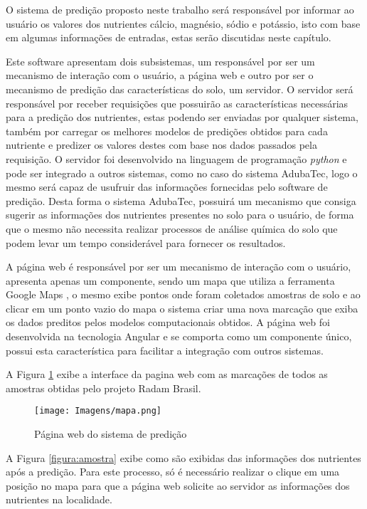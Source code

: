 \documentclass[
12pt,				%
oneside,			%
a4paper,			%
english,			%
french,				%
spanish,			%
brazil				%
]{abntex2}
\begin{document}
O sistema de predição proposto neste trabalho será responsável por informar ao usuário os valores dos nutrientes cálcio, magnésio, sódio e potássio, isto com base em algumas informações de entradas, estas serão discutidas neste capítulo. 

Este software apresentam dois subsistemas, um responsável por ser um mecanismo de interação com o usuário, a página web e outro por ser o mecanismo de predição das características do solo, um servidor. O servidor será responsável por receber requisições que possuirão as características necessárias para a predição dos nutrientes, estas podendo ser enviadas por qualquer sistema, também por carregar os melhores modelos de predições obtidos para cada nutriente e predizer os valores destes com base nos dados passados pela requisição. O servidor foi desenvolvido na linguagem de programação \textit{python} e pode ser integrado a outros sistemas, como no caso do sistema AdubaTec, logo o mesmo será capaz de usufruir das informações fornecidas pelo software de predição. Desta forma o sistema AdubaTec, possuirá um mecanismo que consiga sugerir as informações dos nutrientes presentes no solo para o usuário, de forma que o mesmo não necessita realizar processos de análise química do solo que podem levar um tempo considerável para fornecer os resultados.

A página web é responsável por ser um mecanismo de interação com o usuário, apresenta apenas um componente, sendo um mapa que utiliza a ferramenta Google Maps \textsuperscript{\textregistered}, o mesmo exibe pontos onde foram coletados amostras de solo e ao clicar em um ponto vazio do mapa  o sistema criar uma nova marcação que exiba os dados preditos pelos modelos computacionais obtidos. A página web foi desenvolvida na tecnologia Angular e se comporta como um componente único, possui esta característica para facilitar a integração com outros sistemas. 

A Figura \ref{figura:mapa} exibe a interface da pagina web com as marcações de todos as amostras obtidas pelo projeto Radam Brasil.

\begin{figure}[H]
	\caption{Página web do sistema de predição}
	\centering %
	\texttt{[image: Imagens/mapa.png]} %
	\label{figura:mapa}
\end{figure}


A Figura \ref{figura:amostra} exibe como são exibidas das informações dos nutrientes após a predição. Para este processo, só é necessário realizar o clique em uma posição no mapa para que a página web solicite ao servidor as informações dos nutrientes na localidade.
\end{document}
